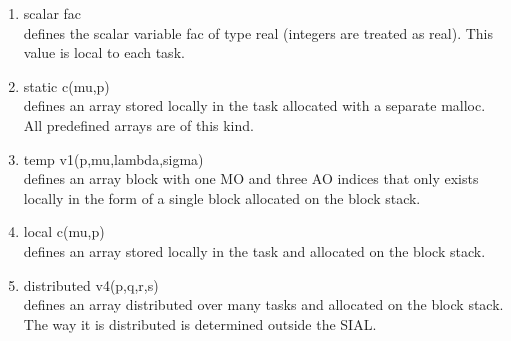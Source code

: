 \documentclass[12pt]{article}
\begin{document}
\begin{enumerate}
\item scalar fac\\ 
defines the scalar variable fac of type real (integers are treated as real). This 
value is local to each task.

\item static c(mu,p)\\ 
defines an array stored locally in the task allocated with a separate malloc. All 
predefined arrays are of this kind.

\item temp v1(p,mu,lambda,sigma)\\ 
defines an array block with one MO and three AO indices that only exists locally in 
the form of a single block allocated on the block stack.

\item local c(mu,p)\\ 
defines an array stored locally in the task and allocated on the block stack.

\item distributed v4(p,q,r,s)\\ 
defines an array distributed over many tasks and allocated on the block stack. 
The way it is distributed is determined outside the SIAL.


\end{enumerate}
\end{document}
